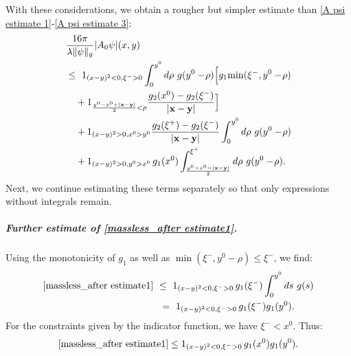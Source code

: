 \documentclass[b5paper,draft,openbib,12pt]{memoir}
\newcommand{\vx}{\mathbf{x}}
\newcommand{\vy}{\mathbf{y}}
\begin{document}
With these considerations, we obtain a rougher but simpler estimate than 
\eqref{A psi estimate 1}-\eqref{A psi estimate 3}:
\begin{align}\notag
    &\frac{16\pi}{\lambda\|\psi\|_g}|A_0\psi|(x,y) \\
    &\le~ \label{massless_after estimate1}
    1_{(x-y)^2<0,\xi^->0} \int_0^{y^0}d\rho~ g(y^0-\!\rho)\Big[ g_1\!\min(\xi^-,y^0-\!\rho) \\\label{massless_after estimate2}
    &~~~+ 1_{\frac{y^0-x^0+|\vx-\vy|}{2}<\rho}\frac{g_2(x^0)-g_2(\xi^-)}{|\vx-\vy|}\Big]\\\label{massless_after estimate3}
    &~~~+1_{(x-y)^2>0,x^0>y^0}\frac{g_2(\xi^+)-g_2(\xi^-)}{|\vx-\vy|} \int_{0}^{y^0}d\rho~ g(y^0-\!\rho)\\\label{massless_after estimate4}
    &~~~+1_{(x-y)^2>0,y^0>x^0}\, g_1(x^0)\int_{\frac{y^0-x^0-|\vx-\vy|}{2}}^{\xi^+}d\rho~ g(y^0-\!\rho).
\end{align}
Next, we continue estimating these terms separately so that only expressions 
without integrals remain.


\subparagraph{Further estimate of \eqref{massless_after estimate1}.}
Using the monotonicity of $g_1$ as well as $\min(\xi^-,y^0-\rho) \leq \xi^-$, 
we find:
\begin{align}
  \eqref{massless_after estimate1} ~&\leq~  1_{(x-y)^2<0,\xi^->0}\, g_1(\xi^-) \int_0^{y^0} ds~ g(s) \notag\\
  &~=~  1_{(x-y)^2<0,\xi^->0} \, g_1(\xi^-) g_1(y^0).
\end{align}
For the constraints given by the indicator function, we have $\xi^- < x^0$. 
Thus:
\begin{equation}
	\eqref{massless_after estimate1} \leq 1_{(x-y)^2<0,\xi^->0} \, g_1(x^0) g_1(y^0).
\label{eq:resultmasslessafterestimate1}
\end{equation}
\end{document}
